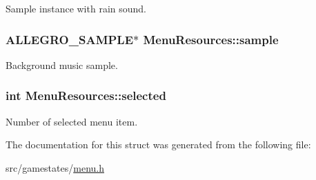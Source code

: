 Sample instance with rain sound. \hypertarget{structMenuResources_af265bb06ac4cdcc8c2af9c59d33f5846}{
\subsubsection[{sample}]{\setlength{\rightskip}{0pt plus 5cm}A\+L\+L\+E\+G\+R\+O\+\_\+\+S\+A\+M\+P\+L\+E$\ast$ Menu\+Resources\+::sample}}\label{structMenuResources_af265bb06ac4cdcc8c2af9c59d33f5846}
Background music sample. \hypertarget{structMenuResources_a19d2b3e2498abfdd4237a9057549f36e}{
\subsubsection[{selected}]{\setlength{\rightskip}{0pt plus 5cm}int Menu\+Resources\+::selected}}\label{structMenuResources_a19d2b3e2498abfdd4237a9057549f36e}
Number of selected menu item. 

The documentation for this struct was generated from the following file\+:\begin{DoxyCompactItemize}
\item 
src/gamestates/\hyperlink{menu_8h}{menu.\+h}\end{DoxyCompactItemize}
